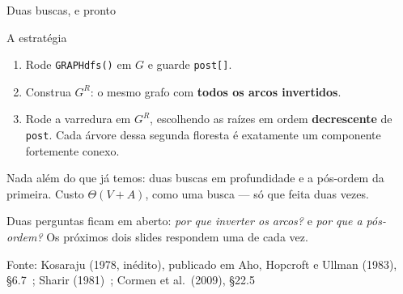 \documentclass[aspectratio=169]{beamer}
\newcommand{\fonte}[1]{\vfill{\tiny\color{gray!60!black}Fonte: #1\par}}
\begin{document}
\begin{frame}{Duas buscas, e pronto}
  \begin{block}{A estratégia}
    {\small
    \begin{enumerate}\small
      \item Rode \texttt{GRAPHdfs()} em $G$ e guarde \texttt{post[]}.
      \item Construa $G^R$: o mesmo grafo com \textbf{todos os arcos invertidos}.
      \item Rode a varredura em $G^R$, escolhendo as raízes em ordem
            \textbf{decrescente} de \texttt{post}. Cada árvore dessa segunda
            floresta é exatamente um componente fortemente conexo.
    \end{enumerate}}
  \end{block}
  \medskip
  {\small Nada além do que já temos: duas buscas em profundidade e a pós-ordem
  da primeira. Custo $\Theta(V+A)$, como uma busca --- só que feita duas vezes.\par}

  \medskip
  {\scriptsize Duas perguntas ficam em aberto: \emph{por que inverter os
  arcos?} e \emph{por que a pós-ordem?} Os próximos dois slides respondem uma
  de cada vez.\par}
  \fonte{Kosaraju (1978, inédito), publicado em Aho, Hopcroft e Ullman (1983), \S 6.7~\cite{aho1983data}; Sharir (1981)~\cite{sharir1981strong}; Cormen et al.\ (2009), \S 22.5~\cite{cormen2009introduction}}
\end{frame}
\end{document}
